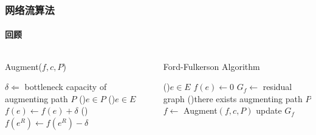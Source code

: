\begin{frame}[plain]
    \frametitle{网络流算法}
    \framesubtitle{回顾}
    \begin{columns}
        \begin{column}{0.5\textwidth}
            \begin{algorithm}[H]
                \caption{Augment($f,c,P$)}
                $\delta\Leftarrow$ bottleneck capacity of augmenting path $P$\;
                \ForEach(){$e\in P$}{
                    \If(){$e\in E$}{
                        $f(e)\leftarrow f(e)+\delta$\;
                    }
                    \Else(){
                        $f(e^R)\leftarrow f(e^R)-\delta$\;
                    }
                }
                \;
            \end{algorithm}
        \end{column}
        \begin{column}{0.5\textwidth}
            \begin{algorithm}[H]
                \caption{Ford-Fulkerson Algorithm}
                \ForEach(){$e\in E$}{
                    $f(e)\leftarrow 0$\;
                }
                $G_f\leftarrow$ residual graph\;
                \While(){there exists augmenting path $P$}{
                    $f\leftarrow$ Augment$(f,c,P)$\;
                    update $G_f$\;
                }
                \;
            \end{algorithm}
        \end{column}
    \end{columns}
\end{frame}


